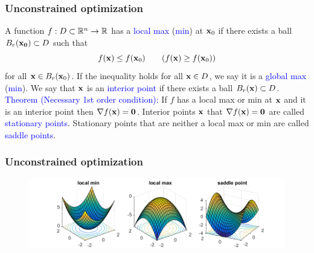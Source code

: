 \documentclass[11pt,aspectratio=169]{beamer}
\begin{document}
\begin{frame}
\frametitle{Unconstrained optimization}
\begin{small}
A function $f:D \subset \mathbb R^n \rightarrow \mathbb R$ has a \textcolor{blue}{local max} (\textcolor{blue}{min})
at ${\bf x}_0$ if there exists a ball $B_r({\bf x_0})\subset D$ such that
$$
f({\bf x}) \leq f({\bf x}_0) \qquad (f({\bf x}) \geq f({\bf x}_0) )
$$
for all ${\bf x} \in B_r({\bf x}_0)$. If the inequality holds for all ${\bf x} \in D$, we say it is a \textcolor{blue}{global max} (\textcolor{blue}{min}).
\vskip 10pt
We say that ${\bf x}$ is an \textcolor{blue}{interior point} if there exists a ball $B_r({\bf x})\subset D$.
\vskip 10pt
 \textcolor{blue}{Theorem (Necessary 1st order condition):} If $f$ has a local max or min at ${\bf x}$ and it is an interior point then $\nabla f ({\bf x})={\bf 0}$.
\vskip 10pt
 Interior points ${\bf x}$ that $\nabla f ({\bf x})={\bf 0}$ are called \textcolor{blue}{stationary points}. 
\vskip 10pt
 Stationary points that are neither a local max or min are called \textcolor{blue}{saddle points}.


\end{small}
\end{frame}

\begin{frame}
\frametitle{Unconstrained optimization}
\begin{figure}
\includegraphics[width=5in]{img/minmaxsaddle.png} 
\end{figure}
\end{frame}
\end{document}
